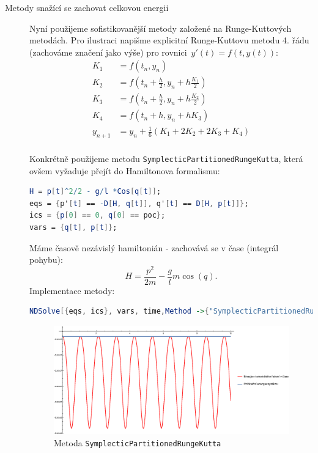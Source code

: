 \begin{description}
\item[Metody snažící se zachovat celkovou energii] 
Nyní použijeme sofistikovanější metody založené na Runge-Kuttových metodách. Pro ilustraci napišme explicitní Runge-Kuttovu metodu 4. řádu (zachováme značení jako výše) pro rovnici~$y'(t)=f(t,y(t))$:
\begin{align*}
K_{1} & = f(t_{n},y_{n}) \\
K_{2} & = f \left(  t_{n}+\frac{h}{2},y_{n}+h\frac{K_{1}}{2} \right)  \\
K_{3} & = f \left(  t_{n}+\frac{h}{2},y_{n}+h\frac{K_{2}}{2} \right)  \\
K_{4} & = f(t_{n}+h,y_{n}+h K_{3}) \\
y_{n+1} & = y_{n}+\frac{1}{6}(K_{1}+2K_{2}+2K_{3}+K_{4})\\
\end{align*}

Konkrétně použijeme metodu \texttt{SymplecticPartitionedRungeKutta}, která ovšem vyžaduje přejít do Hamiltonova formalismu:
\begin{lstlisting}[language=Mathematica,caption=Hamiltonův formalizsmus]
H = p[t]^2/2 - g/l *Cos[q[t]];
eqs = {p'[t] == -D[H, q[t]], q'[t] == D[H, p[t]]};
ics = {p[0] == 0, q[0] == poc};
vars = {q[t], p[t]};
\end{lstlisting}
Máme časově nezávislý hamiltonián - zachovává se v čase (integrál pohybu):
\begin{equation}
H = \frac{p^{2}}{2m} -\frac{g}{l} m \cos(q).
\end{equation}
Implementace metody:
\begin{lstlisting}[language=Mathematica]
NDSolve[{eqs, ics}, vars, time,Method ->{"SymplecticPartitionedRungeKutta","DifferenceOrder" -> 2, "PositionVariables" -> {q[t]}}];
\end{lstlisting}


\begin{figure}[h]
  \centering
  \includegraphics[width=15cm]{figures/SymRK3.eps}
  \caption{Metoda \texttt{SymplecticPartitionedRungeKutta}}
  \label{fig:sprg}
\end{figure}


\end{description}
